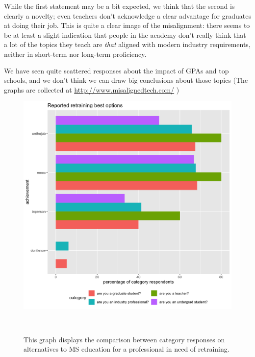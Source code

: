 \documentclass{sigchi}
\begin{document}
While the first statement may be a bit expected, we think that the second is clearly a novelty; even teachers don't acknowledge a clear advantage for graduates at doing their job. This is quite a clear image of the misalignment: there seems to be at least a slight indication that people in the academy don't really think that a lot of the topics they teach are \textit{that} aligned with modern industry requirements, neither in short-term nor long-term proficiency.

We have seen quite scattered responses about the impact of GPAs and top schools, and we don't think we can draw big conclusions about those topics (The graphs are collected at \url{http://www.misalignedtech.com/} ) %

\begin{figure}
  \includegraphics[scale=0.2]{../data-analysis/plots_output/Reported_retraining_best_options.png}
  \caption{This graph displays the comparison between category responses on alternatives to MS education for a professional in need of retraining.}~\label{fig:figure13}
\end{figure}
\end{document}
